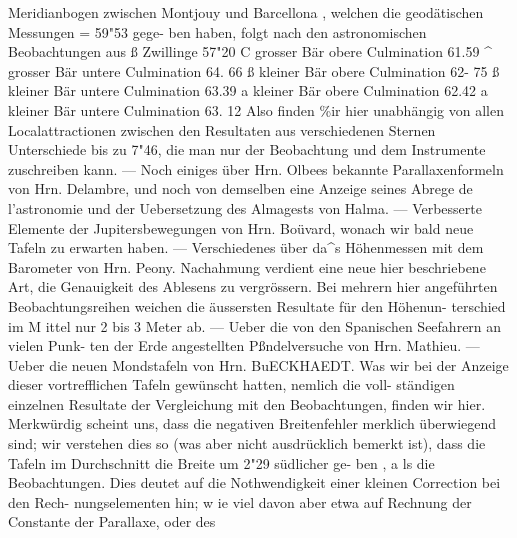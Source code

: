 \documentclass[12pt,a4paper]{article}
\begin{document}
Meridianbogen zwischen Montjouy und Barcellona , welchen die geodätischen Messungen = 59"53 gege-\newline
ben haben, folgt nach den astronomischen Beobachtungen\newline
aus ß Zwillinge 57"20\newline
C grosser Bär obere Culmination 61.59\newline
\^{} grosser Bär untere Culmination 64. 66\newline
ß kleiner Bär obere Culmination 62- 75\newline
ß kleiner Bär untere Culmination 63.39\newline
a kleiner Bär obere Culmination 62.42\newline
a kleiner Bär untere Culmination 63. 12\newline
Also finden \%ir hier unabhängig von allen Localattractionen zwischen den Resultaten aus verschiedenen\newline
Sternen Unterschiede bis zu 7"46, die man nur der Beobachtung und dem Instrumente zuschreiben\newline
kann. --- Noch einiges über Hrn. Olbees bekannte Parallaxenformeln von Hrn. Delambre, und noch\newline
von demselben eine Anzeige seines Abrege de l'astronomie und der Uebersetzung des Almagests von\newline
Halma. --- Verbesserte Elemente der Jupitersbewegungen von Hrn. Boüvard, wonach wir bald neue\newline
Tafeln zu erwarten haben. --- Verschiedenes über da\^{}s Höhenmessen mit dem Barometer von Hrn. Peony.\newline
Nachahmung verdient eine neue hier beschriebene Art, die Genauigkeit des Ablesens zu vergrössern.\newline
Bei mehrern hier angeführten Beobachtungsreihen weichen die äussersten Resultate für den Höhenun-\newline
terschied im M ittel nur 2 bis 3 Meter ab. --- Ueber die von den Spanischen Seefahrern an vielen Punk-\newline
ten der Erde angestellten Pßndelversuche von Hrn. Mathieu. --- Ueber die neuen Mondstafeln von Hrn.\newline
BuECKHAEDT. Was wir bei der Anzeige dieser vortrefflichen Tafeln gewünscht hatten, nemlich die voll-\newline
ständigen einzelnen Resultate der Vergleichung mit den Beobachtungen, finden wir hier. Merkwürdig\newline
scheint uns, dass die negativen Breitenfehler merklich überwiegend sind; wir verstehen dies so (was\newline
aber nicht ausdrücklich bemerkt ist), dass die Tafeln im Durchschnitt die Breite um 2"29 südlicher ge-\newline
ben , a ls die Beobachtungen. Dies deutet auf die Nothwendigkeit einer kleinen Correction bei den Rech-\newline
nungselementen hin; w ie viel davon aber etwa auf Rechnung der Constante der Parallaxe, oder des\newline
\end{document}

